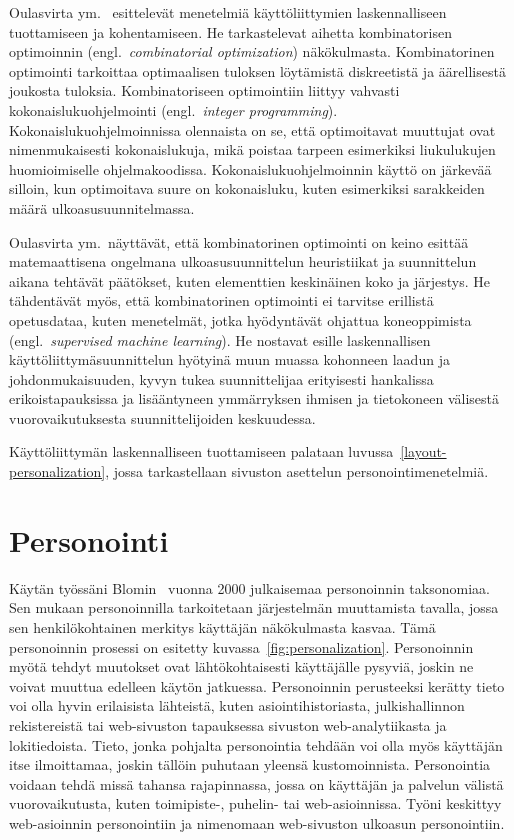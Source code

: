 \documentclass[finnish, 12pt, a4paper, elec, utf8, a-1b]{aaltothesis}
\begin{document}
Oulasvirta ym.~\cite{9000519} esittelevät menetelmiä käyttöliittymien
laskennalliseen tuottamiseen ja kohentamiseen. He tarkastelevat aihetta
kombinatorisen optimoinnin (engl.~\textit{combinatorial optimization})
näkökulmasta. Kombinatorinen optimointi tarkoittaa optimaalisen tuloksen
löytämistä diskreetistä ja äärellisestä joukosta tuloksia. Kombinatoriseen
optimointiin liittyy vahvasti kokonaislukuohjelmointi (engl.~\textit{integer
programming}). Kokonaislukuohjelmoinnissa olennaista on se, että optimoitavat
muuttujat ovat nimenmukaisesti kokonaislukuja, mikä poistaa tarpeen esimerkiksi
liukulukujen huomioimiselle ohjelmakoodissa. Kokonaislukuohjelmoinnin käyttö on
järkevää silloin, kun optimoitava suure on kokonaisluku, kuten esimerkiksi
sarakkeiden määrä ulkoasusuunnitelmassa.

Oulasvirta ym.~näyttävät, että kombinatorinen optimointi on keino esittää
matemaattisena ongelmana ulkoasusuunnittelun heuristiikat ja suunnittelun aikana
tehtävät päätökset, kuten elementtien keskinäinen koko ja järjestys. He
tähdentävät myös, että kombinatorinen optimointi ei tarvitse erillistä
opetusdataa, kuten menetelmät, jotka hyödyntävät ohjattua koneoppimista
(engl.~\textit{supervised machine learning}). He nostavat esille laskennallisen
käyttöliittymäsuunnittelun hyötyinä muun muassa kohonneen laadun ja
johdonmukaisuuden, kyvyn tukea suunnittelijaa erityisesti hankalissa
erikoistapauksissa ja lisääntyneen ymmärryksen ihmisen ja tietokoneen välisestä
vuorovaikutuksesta suunnittelijoiden keskuudessa.

Käyttöliittymän laskennalliseen tuottamiseen palataan
luvussa~\ref{layout-personalization}, jossa tarkastellaan sivuston asettelun
personointimenetelmiä.

\clearpage
\section{Personointi}\label{personalization}

Käytän työssäni Blomin~\cite{10.1145/633292.633483} vuonna 2000 julkaisemaa
personoinnin taksonomiaa. Sen mukaan personoinnilla tarkoitetaan järjestelmän
muuttamista tavalla, jossa sen henkilökohtainen merkitys käyttäjän näkökulmasta
kasvaa. Tämä personoinnin prosessi on esitetty kuvassa~\ref{fig:personalization}.
Personoinnin myötä tehdyt muutokset ovat lähtökohtaisesti käyttäjälle pysyviä,
joskin ne voivat muuttua edelleen käytön jatkuessa. Personoinnin perusteeksi
kerätty tieto voi olla hyvin erilaisista lähteistä, kuten asiointihistoriasta,
julkishallinnon rekistereistä tai web-sivuston tapauksessa sivuston
web-analytiikasta ja lokitiedoista. Tieto, jonka pohjalta personointia tehdään
voi olla myös käyttäjän itse ilmoittamaa, joskin tällöin puhutaan yleensä
kustomoinnista. Personointia voidaan tehdä missä tahansa rajapinnassa, jossa on
käyttäjän ja palvelun välistä vuorovaikutusta, kuten toimipiste-, puhelin- tai
web-asioinnissa. Työni keskittyy web-asioinnin personointiin ja nimenomaan
web-sivuston ulkoasun personointiin.
\end{document}
